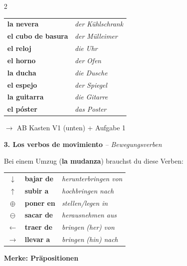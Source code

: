 \documentclass[11pt, a4paper]{article}
\newcommand{\seriftext}[1]{{\fontfamily{ppl}\selectfont #1}}
\newcommand{\es}[1]{\seriftext{\textbf{#1}}}
\newcommand{\de}[1]{\textit{\textcolor{akzent}{#1}}}
\newcommand{\abmark}[1]{{\footnotesize\textcolor{akzent}{$\rightarrow$ AB #1}}}
\newcommand{\abschnitt}[2]{\noindent\textbf{\large #1. #2}}
\begin{document}
\begin{multicols}{2}
\vspace{3pt}

{\footnotesize
\begin{tabular}{@{}ll@{}}
\es{la nevera} & \de{der Kühlschrank} \\
\es{el cubo de basura} & \de{der Mülleimer} \\
\es{el reloj} & \de{die Uhr} \\
\es{el horno} & \de{der Ofen} \\
\es{la ducha} & \de{die Dusche} \\
\es{el espejo} & \de{der Spiegel} \\
\es{la guitarra} & \de{die Gitarre} \\
\es{el póster} & \de{das Poster} \\
\end{tabular}}

\abmark{Kasten V1 (unten) + Aufgabe 1}

\columnbreak

\abschnitt{3}{Los verbos de movimiento} \de{-- Bewegungsverben}

\vspace{4pt}

Bei einem Umzug (\es{la mudanza}) brauchst du diese Verben:

\begin{grammatikbox}
{\small
\begin{tabular}{@{}cll@{}}
$\downarrow$ & \es{bajar de} & \de{herunterbringen von} \\[0.4em]
$\uparrow$ & \es{subir a} & \de{hochbringen nach} \\[0.4em]
$\oplus$ & \es{poner en} & \de{stellen/legen in} \\[0.4em]
$\ominus$ & \es{sacar de} & \de{herausnehmen aus} \\[0.4em]
$\leftarrow$ & \es{traer de} & \de{bringen (her) von} \\[0.4em]
$\rightarrow$ & \es{llevar a} & \de{bringen (hin) nach} \\
\end{tabular}}
\end{grammatikbox}

\vspace{3pt}

\begin{merkbox}
\textbf{Merke: Präpositionen}


\end{merkbox}
\end{multicols}
\end{document}
